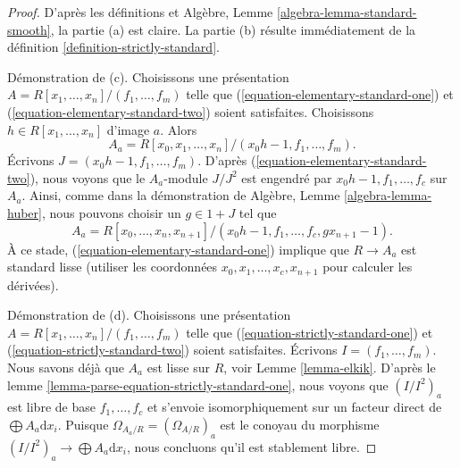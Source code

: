 \begin{proof}
D'après les définitions et
Algèbre, Lemme \ref{algebra-lemma-standard-smooth},
la partie (a) est claire. La partie (b) résulte immédiatement de
la définition \ref{definition-strictly-standard}.

\medskip\noindent
Démonstration de (c). Choisissons une présentation
$A = R[x_1, \ldots, x_n]/(f_1, \ldots, f_m)$ telle que
(\ref{equation-elementary-standard-one}) et
(\ref{equation-elementary-standard-two}) soient satisfaites.
Choisissons $h \in R[x_1, \ldots, x_n]$ d'image $a$. Alors
$$
A_a = R[x_0, x_1, \ldots, x_n]/(x_0h - 1, f_1, \ldots, f_m).
$$
Écrivons $J = (x_0h - 1, f_1, \ldots, f_m)$.
D'après (\ref{equation-elementary-standard-two}), nous voyons que le
$A_a$-module $J/J^2$ est engendré par $x_0h - 1, f_1, \ldots, f_c$ sur
$A_a$. Ainsi, comme dans la démonstration de
Algèbre, Lemme \ref{algebra-lemma-huber}, nous pouvons choisir un $g \in 1 + J$
tel que
$$
A_a = R[x_0, \ldots, x_n, x_{n + 1}]/
(x_0h - 1, f_1, \ldots, f_c, gx_{n + 1} - 1).
$$
À ce stade, (\ref{equation-elementary-standard-one}) implique que $R \to A_a$
est standard lisse (utiliser les coordonnées
$x_0, x_1, \ldots, x_c, x_{n + 1}$ pour calculer les dérivées).

\medskip\noindent
Démonstration de (d). Choisissons une présentation
$A = R[x_1, \ldots, x_n]/(f_1, \ldots, f_m)$ telle que
(\ref{equation-strictly-standard-one}) et
(\ref{equation-strictly-standard-two}) soient satisfaites.
Écrivons $I = (f_1, \ldots, f_m)$.
Nous savons déjà que $A_a$ est lisse sur $R$, voir
Lemme \ref{lemma-elkik}.
D'après le lemme \ref{lemma-parse-equation-strictly-standard-one}, nous voyons que
$(I/I^2)_a$ est libre de base $f_1, \ldots, f_c$ et s'envoie isomorphiquement
sur un facteur direct de $\bigoplus A_a \text{d}x_i$. Puisque
$\Omega_{A_a/R} = (\Omega_{A/R})_a$
est le conoyau du morphisme
$(I/I^2)_a \to \bigoplus A_a \text{d}x_i$,
nous concluons qu'il est stablement libre.


\end{proof}
